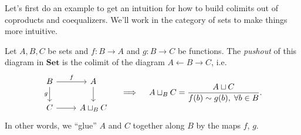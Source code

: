 \begin{solution}
    Let's first do an example to get an intuition for how to build colimits out of coproducts and coequalizers. We'll work in the category of sets to make things more intuitive.

    \begin{example}
        Let $A, B, C$ be sets and $f : B \to A$ and $g : B \to C$ be functions. The \emph{pushout} of this diagram in $\textbf{Set}$ is the colimit of the diagram $A \leftarrow B \rightarrow C$, i.e. 
        \[\begin{tikzcd}
	        B & A \\
	        C & {A\sqcup_BC}
	        \arrow["f", from=1-1, to=1-2]
	        \arrow["g"', from=1-1, to=2-1]
	        \arrow[from=2-1, to=2-2]
	        \arrow[from=1-2, to=2-2]
        \end{tikzcd}\quad \implies\quad A\sqcup_B C = \frac{A\sqcup C}{f(b)\sim g(b),\; \forall b\in B}. \]
        In other words, we ``glue'' $A$ and $C$ together along $B$ by the maps $f$, $g$.
    \end{example}


\end{solution}
